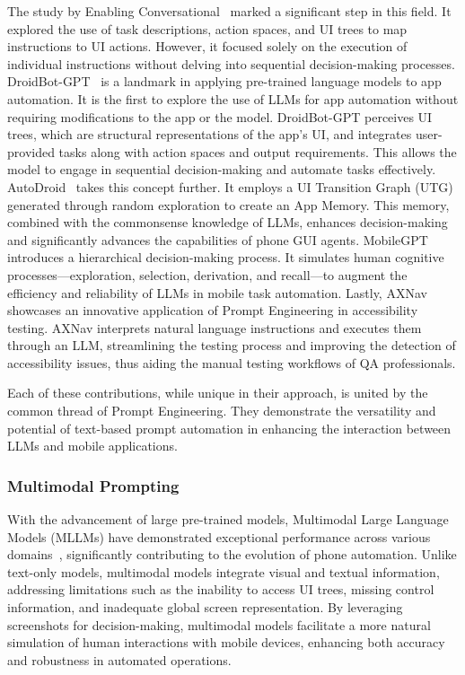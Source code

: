 The study by Enabling Conversational~\cite{wang2023enabling} marked a significant step in this field. It explored the use of task descriptions, action spaces, and UI trees to map instructions to UI actions. However, it focused solely on the execution of individual instructions without delving into sequential decision-making processes.
DroidBot-GPT~\cite{wen2023droidbot} is a landmark in applying pre-trained language models to app automation. It is the first to explore the use of LLMs for app automation without requiring modifications to the app or the model. DroidBot-GPT perceives UI trees, which are structural representations of the app's UI, and integrates user-provided tasks along with action spaces and output requirements. This allows the model to engage in sequential decision-making and automate tasks effectively. 
AutoDroid~\cite{wen2024autodroid} takes this concept further. It employs a UI Transition Graph (UTG) generated through random exploration to create an App Memory. This memory, combined with the commonsense knowledge of LLMs, enhances decision-making and significantly advances the capabilities of phone GUI agents.
MobileGPT~\cite{lee2023exploremobilegpt} introduces a hierarchical decision-making process. It simulates human cognitive processes—exploration, selection, derivation, and recall—to augment the efficiency and reliability of LLMs in mobile task automation.
Lastly, AXNav~\cite{taeb2024axnav} showcases an innovative application of Prompt Engineering in accessibility testing. AXNav interprets natural language instructions and executes them through an LLM, streamlining the testing process and improving the detection of accessibility issues, thus aiding the manual testing workflows of QA professionals.

Each of these contributions, while unique in their approach, is united by the common thread of Prompt Engineering. They demonstrate the versatility and potential of text-based prompt automation in enhancing the interaction between LLMs and mobile applications.

\subsubsection{Multimodal Prompting}
\label{subsubsec: Multimodal Prompt}

With the advancement of large pre-trained models, Multimodal Large Language Models (MLLMs) have demonstrated exceptional performance across various domains~\cite{achiam2023gpt,li2023blip,ye2023mplug,wang2023cogvlm,Qwen-VL,liu2024visual,Qwen2VL,chen2024internvl,chen2024far,koh2024visualwebarena,zheng2023synapse}, significantly contributing to the evolution of phone automation. Unlike text-only models, multimodal models integrate visual and textual information, addressing limitations such as the inability to access UI trees, missing control information, and inadequate global screen representation. By leveraging screenshots for decision-making, multimodal models facilitate a more natural simulation of human interactions with mobile devices, enhancing both accuracy and robustness in automated operations.

